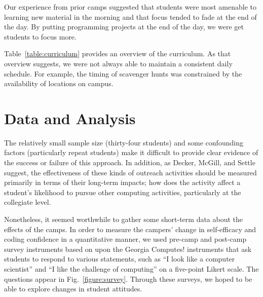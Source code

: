 Our experience from prior camps suggested that students were most
amenable to learning new material in the morning and that focus
tended to fade at the end of the day.  By putting programming
projects at the end of the day, we were get students to focus more.

Table~\ref{table:curriculum} provides an overview of the curriculum.
As that overview suggests, we were not always able to maintain a
consistent daily schedule.  For example, the timing of scavenger
hunts was constrained by the availability of locations on campus.

\section{Data and Analysis}

The relatively small sample size (thirty-four students) and some
confounding factors (particularly repeat students) make it difficult
to provide clear evidence of the success or failure of this approach.
In addition, as Decker, McGill, and Settle \cite{Decker2016,McGill2015}
suggest, the effectiveness of these kinds of outreach activities
should be measured primarily in terms of their long-term impacts;
how does the activity affect a student's likelihood to pursue other
computing activities, particularly at the collegiate level.

Nonetheless, it seemed worthwhile to gather some short-term data
about the effects of the camps.  In order to measure the campers'
change in self-efficacy and coding confidence in a quantitative
manner, we used pre-camp and post-camp survey instruments based on
upon the Georgia Computes! instruments \cite{Bruckman2009} that ask
students to respond to various statements, such as ``I look like a
computer scientist'' and ``I like the challenge of computing'' on
a five-point Likert scale.  The questions appear in
Fig.~\ref{figure:survey}.  Through these surveys, we hoped to be
able to explore changes in student attitudes.

